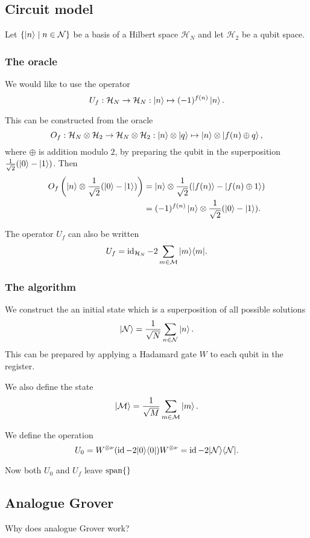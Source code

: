 \subsection{Circuit model}
Let $\left\{ \left| n \right\rangle \;\middle|\; n\in\mathcal{N} \right\}$ be a basis of a Hilbert space $\mathcal{H}_N$ and let $\mathcal{H}_2$ be a qubit space.

\subsubsection{The oracle}
We would like to use the operator
\[ U_f: \mathcal{H}_N\to \mathcal{H}_N: \left| n \right\rangle\mapsto (-1)^{f(n)}\left| n \right\rangle. \]

This can be constructed from the oracle
\[ O_f: \mathcal{H}_N\otimes \mathcal{H}_2 \to \mathcal{H}_N\otimes \mathcal{H}_2: \left| n \right\rangle\otimes \left| q \right\rangle\mapsto \left| n \right\rangle\otimes\left| f(n)\oplus q \right\rangle, \]
where $\oplus$ is addition modulo $2$, by preparing the qubit in the superposition $\frac{1}{\sqrt{2}}(\left| 0 \right\rangle-\left| 1 \right\rangle)$. Then
\begin{align*}
O_f\left(\left| n \right\rangle\otimes \frac{1}{\sqrt{2}}(\left| 0 \right\rangle-\left| 1 \right\rangle)\right)
&= \left| n \right\rangle\otimes \frac{1}{\sqrt{2}}(\left| f(n) \right\rangle-\left| f(n)\oplus 1 \right\rangle) \\
&= (-1)^{f(n)}\left| n \right\rangle\otimes \frac{1}{\sqrt{2}}(\left| 0 \right\rangle-\left| 1 \right\rangle).
\end{align*}

The operator $U_f$ can also be written
\[ U_f = \operatorname{id}_{\mathcal{H}_N} - 2\sum_{m\in\mathcal{M}}|m\rangle\langle m|. \]

\subsubsection{The algorithm}
We construct the an initial state which is a superposition of all possible solutions
\[ \left| \mathcal{N} \right\rangle = \frac{1}{\sqrt{N}}\sum_{n\in\mathcal{N}}\left| n \right\rangle. \]
This can be prepared by applying a Hadamard gate $W$ to each qubit in the register.

We also define the state
\[ \left| \mathcal{M} \right\rangle = \frac{1}{\sqrt{M}}\sum_{m\in\mathcal{M}}\left| m \right\rangle. \]

We define the operation
\[ U_0 = W^{\otimes\nu}(\operatorname{id} - 2|0\rangle\langle0|)W^{\otimes\nu}= \operatorname{id} - 2|\mathcal{N}\rangle\langle\mathcal{N}|. \]

Now both $U_0$ and $U_f$ leave $\operatorname{span}\{\}$

\subsection{Analogue Grover}
Why does analogue Grover work?


